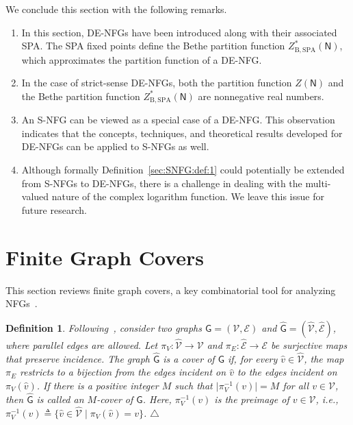 \documentclass[journal]{IEEEtran}
\newcommand{\add}[1]{{\color{black}#1}}
\newtheorem{definition}[theorem]{Definition}
\newcommand{\manualendsymbol}[1]{%
  \leavevmode\unskip\penalty9999\hbox{}\nobreak\hfill
  \quad\hbox{#1}}
\newcommand{\edefinition}{\manualendsymbol{\ensuremath{\triangle}}}
\newcommand{\set}[1]{\mathcal{#1}}
\newcommand{\graphN}{ \mathsf{N} }
\newcommand{\defeq}{ \triangleq }
\newcommand{\ZBSPA}{ Z_{\mathrm{B,SPA}} }
\newcommand*{\ie}{\textit{i.e.}}
\begin{document}
We conclude this section with the following remarks.
\begin{enumerate}
  \item In this section, DE-NFGs have been introduced along with their
        associated SPA. The SPA fixed points define the Bethe partition function
        $\ZBSPA^{*}(\graphN)$, which approximates the partition function of a
        DE-NFG.

  \item In the case of strict-sense DE-NFGs, both the partition function
        $Z(\graphN)$ and the Bethe partition function $\ZBSPA^{*}(\graphN)$ are
        \add{nonnegative} real numbers.

  \item An S-NFG can be viewed as a special case of a DE-NFG. This observation
        indicates that the concepts, techniques, and theoretical results developed
        for DE-NFGs can be applied to S-NFGs as well.

  \item \add{Although formally Definition~\ref{sec:SNFG:def:1} could potentially
          be extended} from S-NFGs to DE-NFGs, there is a challenge in dealing with
        the multi-valued nature of the complex logarithm function. We leave this
        issue for future research.

\end{enumerate}

\section{Finite Graph Covers}
\label{sec:GraCov}

\add{This section reviews finite graph covers, a key combinatorial tool for
  analyzing NFGs~\cite{Koetter2007,Vontobel2013}.}

\begin{definition}
  \add{Following~\cite{Stark:Terras:96:1}, consider two graphs
    $\mathsf{G}=(\set{V},\set{E})$ and
    $\hat{\mathsf{G}}=(\hat{\set{V}},\hat{\set{E}})$, where parallel edges are
    allowed. Let $\pi_V: \hat{\set{V}} \to \set{V}$ and
    $\pi_E: \hat{\set{E}} \to \set{E}$ be surjective maps that preserve
    incidence. The graph $\hat{\mathsf{G}}$ is a cover of $\mathsf{G}$ if, for
    every $\hat{v} \in \hat{\set{V}}$, the map $\pi_E$ restricts to a
    bijection from the edges incident on $\hat{v}$ to the edges incident on
    $\pi_V(\hat{v})$.  If there is a positive integer $M$ such that
    $\bigl| \pi_V^{-1}(v) \bigr| = M$ for all $v \in \set{V}$, then
    $\hat{\mathsf{G}}$ is called an $M$-cover of $\mathsf{G}$. Here,
    $\pi_V^{-1}(v)$ is the preimage of $v \in \set{V}$, \ie,
    $\pi_V^{-1}(v) \defeq \{ \hat{v} \in \hat{\set{V}} \mid \pi_V(\hat{v}) = v
      \}$.} \edefinition
\end{definition}
\end{document}
